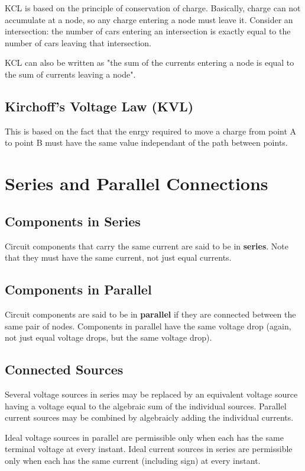 \documentclass[12pt]{article}
\begin{document}
KCL is based on the principle of conservation of charge. Basically, charge can not accumulate at a node, so any charge entering a node must leave it. Consider an intersection: the number of cars entering an intersection is exactly equal to the number of cars leaving that intersection.

KCL can also be written as "the sum of the currents entering a node is equal to the sum of currents leaving a node".

\subsection*{Kirchoff's Voltage Law (KVL)}

This is based on the fact that the enrgy required to move a charge from point A to point B must have the same value independant of the path between points.

\section*{Series and Parallel Connections}
\subsection*{Components in Series}
Circuit components that carry the same current are said to be in {\bf series}. Note that they must have the same current, not just equal currents.

\subsection*{Components in Parallel}
Circuit components are said to be in {\bf parallel} if they are connected between the same pair of nodes. Components in parallel have the same voltage drop (again, not just equal voltage drops, but the same voltage drop).

\subsection*{Connected Sources}
Several voltage sources in series may be replaced by an equivalent voltage source having a voltage equal to the algebraic sum of the individual sources. Parallel current sources may be combined by algebraicly adding the individual currents.

Ideal voltage sources in parallel are permissible only when each has the same terminal voltage at every instant. Ideal current sources in series are permissible only when each has the same current (including sign) at every instant.
\end{document}
